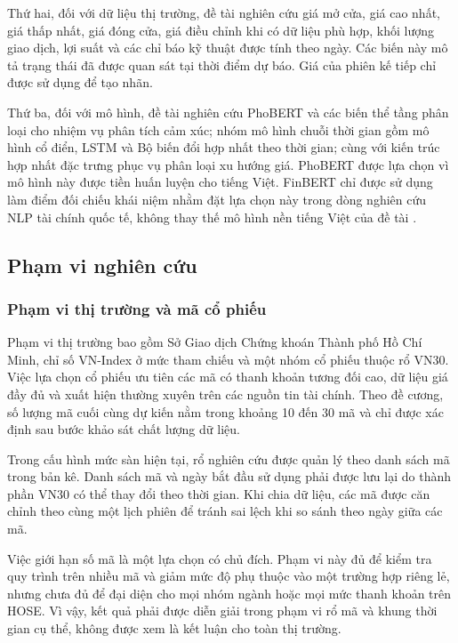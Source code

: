 \documentclass[12pt, a4paper, oneside]{report}
\begin{document}
Thứ hai, đối với dữ liệu thị trường, đề tài nghiên cứu giá mở cửa, giá cao nhất, giá
thấp nhất, giá đóng cửa, giá điều chỉnh khi có dữ liệu phù hợp, khối lượng giao dịch,
lợi suất và các chỉ báo kỹ thuật được tính theo ngày. Các biến này mô tả trạng thái đã
được quan sát tại thời điểm dự báo. Giá của phiên kế tiếp chỉ được sử dụng để tạo nhãn.

Thứ ba, đối với mô hình, đề tài nghiên cứu PhoBERT và các biến thể tầng phân loại cho
nhiệm vụ phân tích cảm xúc; nhóm mô hình chuỗi thời gian gồm mô hình cổ điển, LSTM và
Bộ biến đổi hợp nhất theo thời gian; cùng với kiến trúc hợp nhất đặc trưng phục vụ phân loại
xu hướng giá. PhoBERT được lựa chọn vì mô hình này được tiền huấn luyện cho tiếng Việt.
FinBERT chỉ được sử dụng làm điểm đối chiếu khái niệm nhằm đặt lựa chọn này trong dòng
nghiên cứu NLP tài chính quốc tế, không thay thế mô hình nền tiếng Việt của đề tài
\cite{Nguyen2020_200300744v3,Yang2020_200608097v2}.

\subsection{Phạm vi nghiên cứu}

\subsubsection{Phạm vi thị trường và mã cổ phiếu}

Phạm vi thị trường bao gồm Sở Giao dịch Chứng khoán Thành phố Hồ Chí Minh, chỉ số
VN-Index ở mức tham chiếu và một nhóm cổ phiếu thuộc rổ VN30. Việc lựa chọn cổ phiếu
ưu tiên các mã có thanh khoản tương đối cao, dữ liệu giá đầy đủ và xuất hiện thường
xuyên trên các nguồn tin tài chính. Theo đề cương, số lượng mã cuối cùng dự kiến nằm trong
khoảng 10 đến 30 mã và chỉ được xác định sau bước khảo sát chất lượng dữ liệu.

Trong cấu hình mức sàn hiện tại, rổ nghiên cứu được quản lý theo danh sách mã trong
bản kê. Danh sách mã và ngày bắt đầu sử dụng phải được lưu lại do thành phần VN30 có
thể thay đổi theo thời gian. Khi chia dữ liệu, các mã được căn chỉnh theo cùng một lịch
phiên để tránh sai lệch khi so sánh theo ngày giữa các mã.

Việc giới hạn số mã là một lựa chọn có chủ đích. Phạm vi này đủ để kiểm tra quy trình
trên nhiều mã và giảm mức độ phụ thuộc vào một trường hợp riêng lẻ, nhưng chưa đủ để đại
diện cho mọi nhóm ngành hoặc mọi mức thanh khoản trên HOSE. Vì vậy, kết quả phải được
diễn giải trong phạm vi rổ mã và khung thời gian cụ thể, không được xem là kết luận cho
toàn thị trường.
\end{document}
